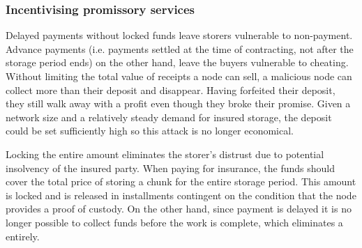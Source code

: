 
\subsubsection{Incentivising promissory services}

Delayed payments without locked funds leave storers vulnerable to non-payment. Advance payments (i.e. payments settled at the time of contracting, not after the storage period ends) on the other hand, leave the buyers vulnerable to cheating. Without limiting the total value of receipts a node can sell, a malicious node can collect more than their deposit and disappear. Having forfeited their deposit, they still walk away with a profit even though they broke their promise. Given a network size and a relatively steady demand for insured storage, the deposit could be set sufficiently high so this attack is no longer economical.

Locking the entire amount eliminates the storer's distrust due to potential insolvency of the insured party. When paying for insurance, the funds should cover the total price of storing a chunk for the entire storage period. This amount is locked and is released in installments contingent on the condition that the node provides a proof of custody. On the other hand, since payment is delayed it is no longer possible to collect funds before the work is complete, which eliminates a  entirely.



 


